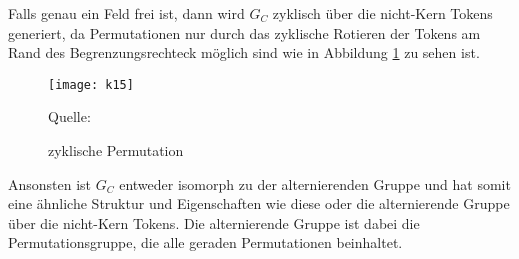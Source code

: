 \documentclass[seminar,german]{algothesis}
\newcommand*{\quelle}{%
  \footnotesize Quelle:
}
\begin{document}
\noindent
Falls genau ein Feld frei ist, dann wird $G_C$ zyklisch über die nicht-Kern Tokens generiert, da Permutationen nur durch das zyklische Rotieren der Tokens am Rand des Begrenzungsrechteck möglich sind wie in Abbildung \ref{fig:16} zu sehen ist.

\begin{figure}[ht]
	\centering
	\texttt{[image: k15]}
	\caption{zyklische Permutation}
	\quelle\cite{akitaya2022pushing}
	\label{fig:16}
\end{figure}

\noindent
Ansonsten ist $G_C$ entweder isomorph zu der alternierenden Gruppe und hat somit eine ähnliche Struktur und Eigenschaften wie diese oder die alternierende Gruppe über die nicht-Kern Tokens. 
Die alternierende Gruppe ist dabei die Permutationsgruppe, die alle geraden Permutationen beinhaltet.
\end{document}
